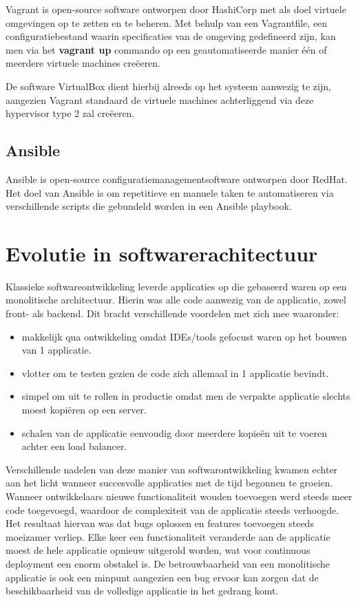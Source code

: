 Vagrant is open-source software ontworpen door HashiCorp met als doel virtuele omgevingen op te zetten en te beheren. \autocite{Vagrant2022} Met behulp van een Vagrantfile, een configuratiebestand waarin specificaties van de omgeving gedefineerd zijn, kan men via het {\bf vagrant up} commando op een geautomatiseerde manier één of meerdere virtuele machines creëeren. 

De software VirtualBox dient hierbij alreeds op het systeem aanwezig te zijn, aangezien Vagrant standaard de virtuele machines achterliggend via deze hypervisor type 2 zal creëeren. \autocite{Vagrant2022a}

\subsection{Ansible}

Ansible is open-source configuratiemanagementsoftware ontworpen door RedHat. Het doel van Ansible is om repetitieve en manuele taken te automatiseren via verschillende scripts die gebundeld worden in een Ansible playbook. \autocite{RedHatAnsible2022} 

\section{Evolutie in softwarerachitectuur}

Klassieke softwareontwikkeling leverde applicaties op die gebaseerd waren op een monolitische architectuur. Hierin was alle code aanwezig van de applicatie, zowel front- als backend. 
Dit bracht verschillende voordelen met zich mee waaronder:
\begin{itemize}
    \item makkelijk qua ontwikkeling omdat IDEs/tools gefocust waren op het bouwen van 1 applicatie.
    \item vlotter om te testen gezien de code zich allemaal in 1 applicatie bevindt. 
    \item simpel om uit te rollen in productie omdat men de verpakte applicatie slechts moest kopiëren op een server. 
    \item schalen van de applicatie eenvoudig door meerdere kopieën uit te voeren achter een load balancer.
\end{itemize} 

Verschillende nadelen van deze manier van softwarontwikkeling kwamen echter aan het licht wanneer succesvolle applicaties met de tijd begonnen te groeien. Wanneer ontwikkelaars nieuwe functionaliteit wouden toevoegen werd steeds meer code toegevoegd, waardoor de complexiteit van de applicatie steeds verhoogde. Het resultaat hiervan was dat bugs oplossen en features toevoegen steeds moeizamer verliep. Elke keer een functionaliteit veranderde aan de applicatie moest de hele applicatie opnieuw uitgerold worden, wat voor continuous deployment een enorm obstakel is.
De betrouwbaarheid van een monolitische applicatie is ook een minpunt aangezien een bug ervoor kan zorgen dat de beschikbaarheid van de volledige applicatie in het gedrang komt. \autocite{Richardson2015}

